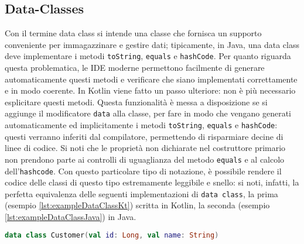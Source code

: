 \subsection{Data-Classes}
Con il termine data class si intende una classe che fornisca un supporto conveniente per immagazzinare e gestire dati; tipicamente, in Java, una data class deve implementare i metodi \texttt{toString}, \texttt{equals} e \texttt{hashCode}. Per quanto riguarda questa problematica, le IDE moderne permettono facilmente di generare automaticamente questi metodi e verificare che siano implementati correttamente e in modo coerente. In Kotlin viene fatto un passo ulteriore: non è più necessario esplicitare questi metodi. Questa funzionalità è messa a disposizione se si aggiunge il modificatore \texttt{data} alla classe, per fare in modo che vengano generati automaticamente ed implicitamente i metodi \texttt{toString}, \texttt{equals} e \texttt{hashCode}: questi verranno inferiti dal compilatore, permettendo di risparmiare decine di linee di codice. Si noti che le proprietà non dichiarate nel costruttore primario non prendono parte ai controlli di uguaglianza del metodo \texttt{equals} e al calcolo dell’\texttt{hashcode}.
Con questo particolare tipo di notazione, è possibile rendere il codice delle classi di questo tipo estremamente leggibile e snello: si noti, infatti, la perfetta equivalenza delle seguenti implementazioni di \texttt{data class}, la prima (esempio \ref{lst:exampleDataClassKt}) scritta in Kotlin, la seconda (esempio \ref{lst:exampleDataClassJava}) in Java.\\

\begin{lstlisting}[caption={Data Class in Kotlin}, captionpos=b, label={lst:exampleDataClassKt}, language=Kotlin]
data class Customer(val id: Long, val name: String)
\end{lstlisting}

